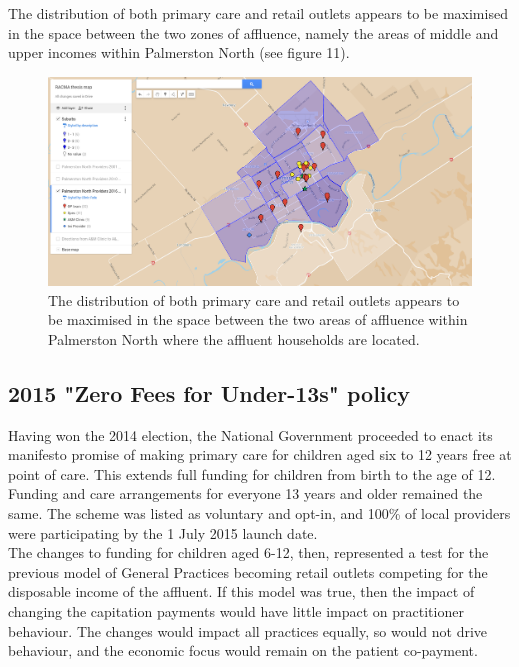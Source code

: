 \documentclass[11pt,a4paper]{article}
\begin{document}
The distribution of both primary care and retail outlets appears to be maximised in the space between the two zones of affluence, namely the areas of middle and upper incomes within Palmerston North (see figure 11).\\


\begin{figure}[htp]
\centering
\includegraphics[scale=0.30]{fig12.png}
\caption{The distribution of both primary care and retail outlets appears to be maximised in the space between the two areas of affluence within Palmerston North where the affluent households are located.}
\label{Distribution of General Practitioners overlaid on suburb's social deprivation}
\end{figure}


\pagebreak
\subsection{2015 "Zero Fees for Under-13s" policy}
Having won the 2014 election, the National Government proceeded to enact its manifesto promise of making primary care for children aged six to 12 years free at point of care. This extends full funding for children from birth to the age of 12. Funding and care arrangements for everyone 13 years and older remained the same. The scheme was listed as voluntary and opt-in, and  100\% of local providers were participating by the 1 July 2015 launch date.\\


The changes to funding for children aged 6-12, then, represented a test for the previous model of General Practices becoming retail outlets competing for the disposable income of the affluent. If this model was true, then the impact of changing the capitation payments would have little impact on practitioner behaviour. The changes would impact all practices equally, so would not drive behaviour, and the economic focus would remain on the patient co-payment.\\
\end{document}
